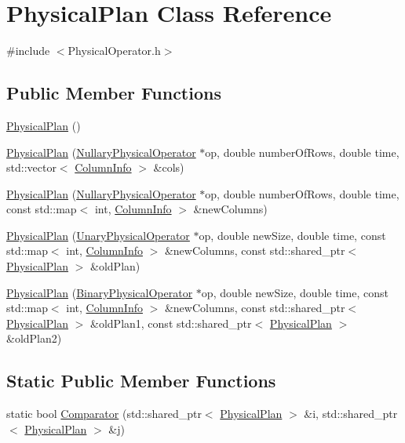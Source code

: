 \hypertarget{class_physical_plan}{\section{Physical\+Plan Class Reference}
\label{class_physical_plan}
}


{\ttfamily \#include $<$Physical\+Operator.\+h$>$}

\subsection*{Public Member Functions}
\begin{DoxyCompactItemize}
\item 
\hyperlink{class_physical_plan_a4030a09eb03efd4093f0d237aea9505e}{Physical\+Plan} ()
\item 
\hyperlink{class_physical_plan_a1cf06adf78f2ccb7cbd2d93b119a25f6}{Physical\+Plan} (\hyperlink{class_nullary_physical_operator}{Nullary\+Physical\+Operator} $\ast$op, double number\+Of\+Rows, double time, std\+::vector$<$ \hyperlink{class_column_info}{Column\+Info} $>$ \&cols)
\item 
\hyperlink{class_physical_plan_a7f1bdc130a27a973a12a2da3b66ca43d}{Physical\+Plan} (\hyperlink{class_nullary_physical_operator}{Nullary\+Physical\+Operator} $\ast$op, double number\+Of\+Rows, double time, const std\+::map$<$ int, \hyperlink{class_column_info}{Column\+Info} $>$ \&new\+Columns)
\item 
\hyperlink{class_physical_plan_a6b8c83da5833167badf7740947297b75}{Physical\+Plan} (\hyperlink{class_unary_physical_operator}{Unary\+Physical\+Operator} $\ast$op, double new\+Size, double time, const std\+::map$<$ int, \hyperlink{class_column_info}{Column\+Info} $>$ \&new\+Columns, const std\+::shared\+\_\+ptr$<$ \hyperlink{class_physical_plan}{Physical\+Plan} $>$ \&old\+Plan)
\item 
\hyperlink{class_physical_plan_aad6b6a033d32215d38c720904d16a44e}{Physical\+Plan} (\hyperlink{class_binary_physical_operator}{Binary\+Physical\+Operator} $\ast$op, double new\+Size, double time, const std\+::map$<$ int, \hyperlink{class_column_info}{Column\+Info} $>$ \&new\+Columns, const std\+::shared\+\_\+ptr$<$ \hyperlink{class_physical_plan}{Physical\+Plan} $>$ \&old\+Plan1, const std\+::shared\+\_\+ptr$<$ \hyperlink{class_physical_plan}{Physical\+Plan} $>$ \&old\+Plan2)
\end{DoxyCompactItemize}
\subsection*{Static Public Member Functions}
\begin{DoxyCompactItemize}
\item 
static bool \hyperlink{class_physical_plan_a52cbdf31b5d5c9dcdc6730dd1b516e7b}{Comparator} (std\+::shared\+\_\+ptr$<$ \hyperlink{class_physical_plan}{Physical\+Plan} $>$ \&i, std\+::shared\+\_\+ptr$<$ \hyperlink{class_physical_plan}{Physical\+Plan} $>$ \&j)
\end{DoxyCompactItemize}
